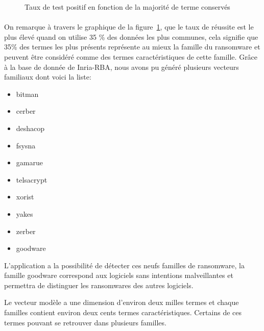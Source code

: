 \documentclass[a4paper, 12pt]{book}
\begin{document}
\begin{figure}[!h]
\caption{Taux de test positif en fonction de la majorité de terme conservés}
\label{graphTaux}
\end{figure}
\newpage
\paragraph{}
On remarque à travers le graphique de la figure~\ref{graphTaux}, que le taux de réussite est le plus élevé quand on utilise 35 \% des données les plus communes, cela signifie que 35\% des termes les plus présents représente au mieux la famille du ransomware et peuvent être considéré comme des termes caractéristiques de cette famille.
Grâce à la base de donnée de Inria-RBA, nous avons pu généré plusieurs vecteurs familiaux dont voici la liste:
\begin{itemize}
\item bitman
\item cerber
\item deshacop
\item fsysna
\item gamarue
\item telsacrypt
\item xorist
\item yakes
\item zerber
\item goodware
\end{itemize}

L'application a la possibilité de détecter ces neufs familles de ransomware, la famille goodware correspond aux logiciels sans intentions malveillantes et permettra de distinguer les ransomwares des autres logiciels.

Le vecteur modèle a une dimension d'environ deux milles termes et chaque familles contient environ deux cents termes caractéristiques. Certains de ces termes pouvant se retrouver dans plusieurs familles.  
\end{document}
